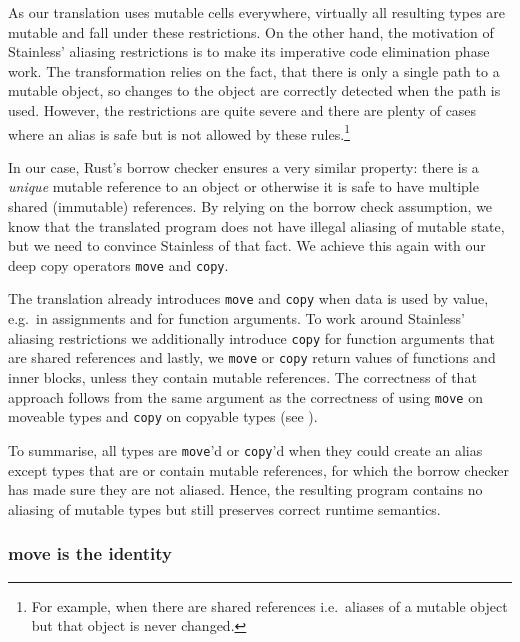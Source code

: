 As our translation uses mutable cells everywhere, virtually all
resulting types are mutable and fall under these restrictions. On the
other hand, the motivation of Stainless' aliasing restrictions is to
make its imperative code elimination phase work. \cite{regb} The
transformation relies on the fact, that there is only a single path to a
mutable object, so changes to the object are correctly detected when the
path is used. However, the restrictions are quite severe and there are
plenty of cases where an alias is safe but is not allowed by these
rules.\footnote{For example, when there are shared references i.e.~aliases of a
mutable object but that object is never changed.}

In our case, Rust's borrow checker ensures a very similar property:
there is a \emph{unique} mutable reference to an object or otherwise it
is safe to have multiple shared (immutable) references. By relying on
the borrow check assumption, we know that the translated program does
not have illegal aliasing of mutable state, but we need to convince
Stainless of that fact. We achieve this again with our deep copy
operators \passthrough{\lstinline!move!} and
\passthrough{\lstinline!copy!}.

The translation already introduces \passthrough{\lstinline!move!} and
\passthrough{\lstinline!copy!} when data is used by value, e.g.~in
assignments and for function arguments. To work around Stainless'
aliasing restrictions we additionally introduce
\passthrough{\lstinline!copy!} for function arguments that are shared
references and lastly, we \passthrough{\lstinline!move!} or
\passthrough{\lstinline!copy!} return values of functions and inner
blocks, unless they contain mutable references. The correctness of that
approach follows from the same argument as the correctness of using
\passthrough{\lstinline!move!} on moveable types and
\passthrough{\lstinline!copy!} on copyable types (see ).

To summarise, all types are \passthrough{\lstinline!move!}'d or
\passthrough{\lstinline!copy!}'d when they could create an alias except
types that are or contain mutable references, for which the borrow
checker has made sure they are not aliased. Hence, the resulting program
contains no aliasing of mutable types but still preserves correct
runtime semantics.

\subsubsection{move is the identity}

